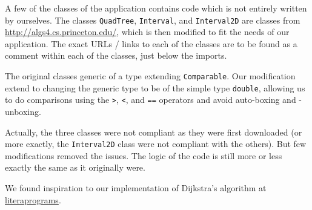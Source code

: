 A few of the classes of the application contains code which is not entirely written by ourselves. The classes \texttt{QuadTree}, \texttt{Interval}, and \texttt{Interval2D} are classes from \url{http://algs4.cs.princeton.edu/}, which is then modified to fit the needs of our application. The exact URLs / links to each of the classes are to be found as a comment within each of the classes, just below the imports.

The original classes generic of a type extending \texttt{Comparable}. Our modification extend to changing the generic type to be of the simple type \texttt{double}, allowing us to do comparisons using the \texttt{>}, \texttt{<}, and \texttt{==} operators and avoid auto-boxing and -unboxing.

Actually, the three classes were not compliant as they were first downloaded (or more exactly, the \texttt{Interval2D} class were not compliant with the others). But few modifications removed the issues. The logic of the code is still more or less exactly the same as it originally were.

We found inspiration to our implementation of Dijkstra's algorithm at \href{http://en.literateprograms.org/Special:DownloadCode/Dijkstra\%27s_algorithm_(Java)}{literaprograms}.